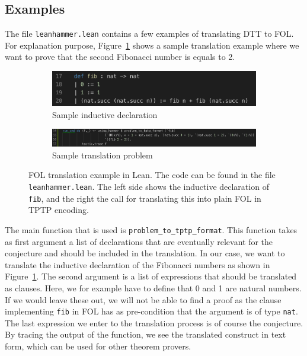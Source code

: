\documentclass[a4paper]{article}
\begin{document}
\subsection{Examples}
The file \texttt{leanhammer.lean} contains a few examples of translating DTT to FOL. For explanation purpose, Figure~\ref{fig:fol_example_declaration} shows a sample translation example where we want to prove that the second Fibonacci number is equals to 2.
\begin{figure}[ht!]
	\centering
	\begin{subfigure}{0.33\textwidth}
		\centering
		\includegraphics[width=\textwidth]{figures/fol_example_fib_definition.png}
		\caption{Sample inductive declaration}
		\label{fig:fol_example_declaration}
	\end{subfigure}
	\hspace{1mm}
	\begin{subfigure}{0.65\textwidth}
		\centering
		\includegraphics[width=\textwidth]{figures/fol_example_call.png}
		\caption{Sample translation problem}
		\label{fig:fol_example_translation}
	\end{subfigure}
	\caption{FOL translation example in Lean. The code can be found in the file \texttt{leanhammer.lean}. The left side shows the inductive declaration of \texttt{fib}, and the right the call for translating this into plain FOL in TPTP encoding. }
	\label{fig:fol_example}
\end{figure}

The main function that is used is \texttt{problem\_to\_tptp\_format}. This function takes as first argument a list of declarations that are eventually relevant for the conjecture and should be included in the translation. In our case, we want to translate the inductive declaration of the Fibonacci numbers as shown in Figure~\ref{fig:fol_example_declaration}. The second argument is a list of expressions that should be translated as clauses. Here, we for example have to define that 0 and 1 are natural numbers. If we would leave these out, we will not be able to find a proof as the clause implementing \texttt{fib} in FOL has as pre-condition that the argument is of type \texttt{nat}. The last expression we enter to the translation process is of course the conjecture. By tracing the output of the function, we see the translated construct in text form, which can be used for other theorem provers. \\
\end{document}
